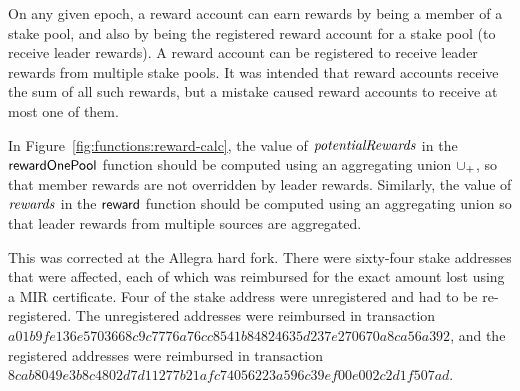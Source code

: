 On any given epoch, a reward account can earn rewards by being a member of a stake pool,
and also by being the registered reward account for a stake pool (to receive leader rewards).
A reward account can be registered to receive leader rewards from multiple stake pools.
It was intended that reward accounts receive the sum of all such rewards,
but a mistake caused reward accounts to receive at most one of them.

In Figure~\ref{fig:functions:reward-calc}, the value of $\mathit{potentialRewards}$ in the
$\mathsf{rewardOnePool}$ function should be computed using an aggregating union
$\mathbin{\cup_{+}}$, so that member rewards are not overridden by leader rewards.
Similarly, the value of $\mathit{rewards}$ in the $\mathsf{reward}$ function should be computed
using an aggregating union so that leader rewards from multiple sources are aggregated.

This was corrected at the Allegra hard fork.
There were sixty-four stake addresses that were affected,
each of which was reimbursed for the exact amount lost using a MIR certificate.
Four of the stake address were unregistered and had to be re-registered.
The unregistered addresses were reimbursed in transaction
\newline
$a01b9fe136e5703668c9c7776a76cc8541b84824635d237e270670a8ca56a392$,
and the registered addresses were reimbursed in transaction
\newline
$8cab8049e3b8c4802d7d11277b21afc74056223a596c39ef00e002c2d1f507ad$.
